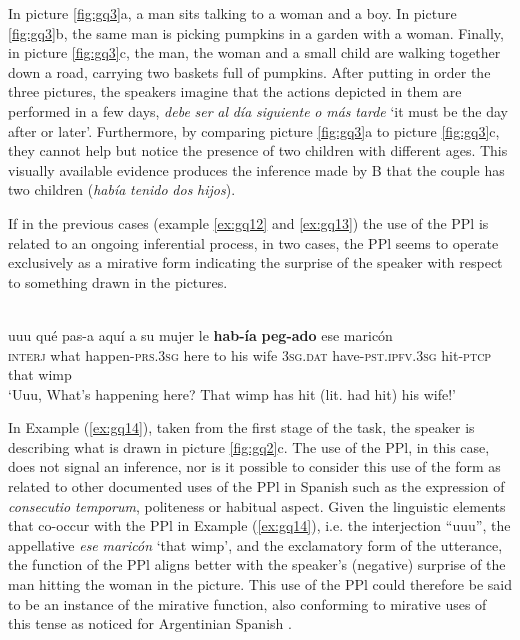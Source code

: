\documentclass[output=paper]{langsci/langscibook}
\begin{document}
In picture \ref{fig:gq3}a, a man sits talking to a woman and a boy. In picture \ref{fig:gq3}b, the same man is picking pumpkins in a garden with a woman. Finally, in picture \ref{fig:gq3}c, the man, the woman and a small child are walking together down a road, carrying two baskets full of pumpkins. After putting in order the three pictures, the speakers imagine that the actions depicted in them are performed in a few days, \textit{debe} \textit{ser} \textit{al} \textit{día} \textit{siguiente} \textit{o} \textit{más} \textit{tarde} ‘it must be the day after or later’. Furthermore, by comparing picture \ref{fig:gq3}a to picture \ref{fig:gq3}c, they cannot help but notice the presence of two children with different ages. This visually available evidence produces the inference made by B that the couple has two children (\textit{había} \textit{tenido} \textit{dos} \textit{hijos}). 

If in the previous cases (example \ref{ex:gq12} and \ref{ex:gq13}) the use of the PPl is related to an ongoing inferential process, in two cases, the PPl seems to operate exclusively as a mirative form indicating the surprise of the speaker with respect to something drawn in the pictures.

\ea \label{ex:gq14}
\\
	\gll uuu qué pas-a aquí a su mujer le \textbf{hab-ía} \textbf{peg-ado} ese maricón\\
	\textsc{interj} what happen-\textsc{prs.3sg} here to his wife \textsc{3sg.dat} have-\textsc{pst.ipfv.3sg} hit-\textsc{ptcp} that wimp\\
	\glt ‘Uuu, What’s happening here? That wimp has hit (lit. had hit) his wife!’
\z

In Example (\ref{ex:gq14}), taken from the first stage of the task, the speaker is describing what is drawn in picture \ref{fig:gq2}c. The use of the PPl, in this case, does not signal an inference, nor is it possible to consider this use of the form as related to other documented uses of the PPl in Spanish such as the expression of \textit{consecutio} \textit{temporum}, politeness or habitual aspect. Given the linguistic elements that co-occur with the PPl in Example (\ref{ex:gq14}), i.e. the interjection “uuu”, the appellative \textit{ese} \textit{maricón} ‘that wimp’, and the exclamatory form of the utterance, the function of the PPl aligns better with the speaker’s (negative) surprise of the man hitting the woman in the picture. This use of the PPl could therefore be said to be an instance of the mirative function, also conforming to mirative uses of this tense as noticed for Argentinian Spanish \citep{Bermudez2008}.
\end{document}
